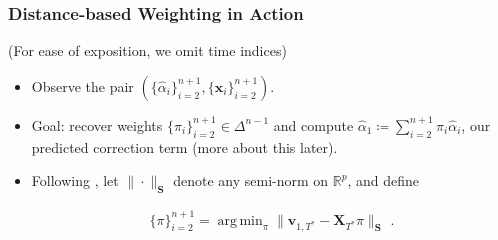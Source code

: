 \documentclass[9pt]{beamer}
\newcommand{\weight}{\pi}
\newcommand{\V}{\textbf{X}}
\newcommand{\x}{\textbf{x}}
\DeclareMathOperator*{\argmin}{arg\,min} %
\theoremstyle{definition}
\begin{document}
    \begin{frame}
    \frametitle{Distance-based Weighting in Action}

    (For ease of exposition, we omit time indices)\\
    
        \bigskip

    \begin{itemize}
    
    \item <1->  Observe the pair $(\{\hat\alpha_{i}\}^{n+1}_{i=2},\{\x_{i}\}^{n+1}_{i=2})$.  \\
    
    \item <2-> Goal: recover weights $\{\weight_{i}\}^{n+1}_{i=2} \in \Delta^{n-1}$ and compute $\hat\alpha_{1} \coloneq \sum^{n+1}_{i=2}\weight_{i}\hat\alpha_{i}$, our predicted correction term (more about this later).
    
    \item <3-> Following \cite{abadie2003economic,abadie2010synthetic}, let $\|\cdot\|_{\textbf{S}}$ denote any semi-norm on $\mathbb{R}^{p}$, and define
    
    
    \begin{align*}
    \{\pi\}_{i=2}^{n+1} = \argmin_{\pi}\|\textbf{v}_{1,T^{*}} - \V_{T^{*}}\pi \|_{\textbf{S}} \text{ .}
    \end{align*}
    
    
    \end{itemize}
    \end{frame}
\end{document}
